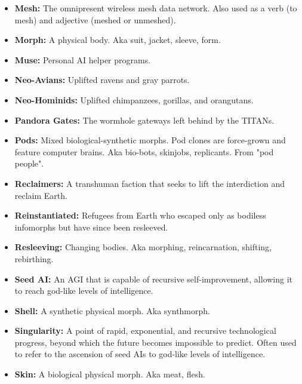 \begin{itemize}
   \item \textbf{Mesh:} The omnipresent wireless mesh data network. Also used
      as a verb (to mesh) and adjective (meshed or unmeshed).  

   \item \textbf{Morph:} A physical body. Aka suit, jacket, sleeve, form.  

   \item \textbf{Muse:} Personal AI helper programs.  

   \item \textbf{Neo-Avians:} Uplifted ravens and gray parrots.  

   \item \textbf{Neo-Hominids:} Uplifted chimpanzees, gorillas, and orangutans.  

   \item \textbf{Pandora Gates:} The wormhole gateways left behind by the TITANs.  

   \item \textbf{Pods:} Mixed biological-synthetic morphs. Pod clones are
      force-grown and feature computer brains. Aka bio-bots, skinjobs,
      replicants. From "pod people".  

   \item \textbf{Reclaimers:} A transhuman faction that seeks to lift the
      interdiction and reclaim Earth.  

   \item \textbf{Reinstantiated:} Refugees from Earth who escaped only as
      bodiless infomorphs but have since been resleeved.  

   \item \textbf{Resleeving:} Changing bodies. Aka morphing, reincarnation,
      shifting, rebirthing.  
   \item \textbf{Seed AI:} An AGI that is capable of recursive
      self-improvement, allowing it to reach god-like levels of intelligence.  

   \item \textbf{Shell:} A synthetic physical morph. Aka synthmorph.

   \item \textbf{Singularity:} A point of rapid, exponential, and recursive
      technological progress, beyond which the future becomes impossible to
      predict. Often used to refer to the ascension of seed AIs to god-like
      levels of intelligence.  

   \item \textbf{Skin:} A biological physical morph. Aka meat, flesh.  


\end{itemize}
